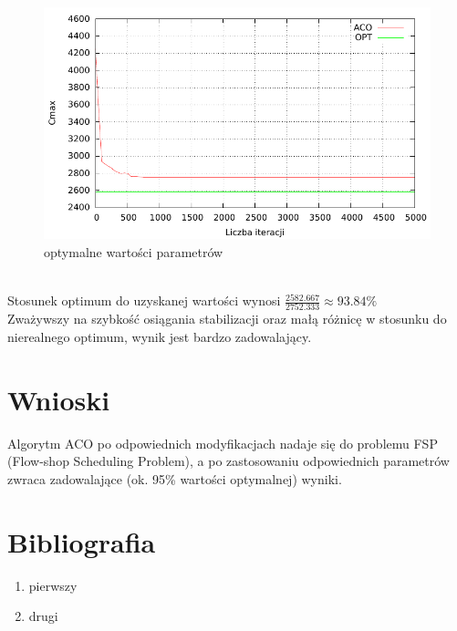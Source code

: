 \documentclass[10pt,a4paper]{article}
\begin{document}
\begin{figure}[h]
    \centering
    \includegraphics{./figures/inst_01_rnd_final_smooth.pdf}
    \caption{optymalne wartości parametrów}
\end{figure}
\vspace{2cm}
\\
Stosunek optimum do uzyskanej wartości wynosi $ \frac{2582.667}{2752.333} \approx 93.84\% $\\
Zważywszy na szybkość osiągania stabilizacji oraz małą różnicę w stosunku do nierealnego optimum, wynik jest bardzo zadowalający.

\newpage
\section{Wnioski}
Algorytm ACO po odpowiednich modyfikacjach nadaje się do problemu FSP (Flow-shop Scheduling Problem), a po zastosowaniu odpowiednich parametrów zwraca zadowalające (ok. 95\% wartości optymalnej) wyniki.


\vspace{2,5cm}
\section{Bibliografia}
\begin{enumerate}
  \item pierwszy
  \item drugi
\end{enumerate}
\end{document}

